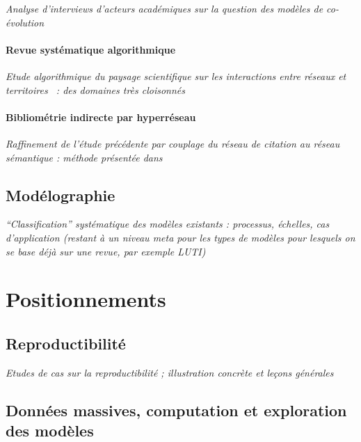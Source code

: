 \textit{Analyse d'interviews d'acteurs académiques sur la question des modèles de co-évolution}


\paragraph{Revue systématique algorithmique}

\textit{Etude algorithmique du paysage scientifique sur les interactions entre réseaux et territoires~\cite{raimbault2015models} : des domaines très cloisonnés}


\paragraph{Bibliométrie indirecte par hyperréseau}


\textit{Raffinement de l'étude précédente par couplage du réseau de citation au réseau sémantique : méthode présentée dans~\cite{raimbault2016indirect}} 




\subsection{Modélographie}

\textit{``Classification'' systématique des modèles existants : processus, échelles, cas d'application (restant à un niveau meta pour les types de modèles pour lesquels on se base déjà sur une revue, par exemple LUTI)}



\section{Positionnements}


\subsection{Reproductibilité}

\textit{Etudes de cas sur la reproductibilité ; illustration concrète et leçons générales}

\subsection{Données massives, computation et exploration des modèles}

